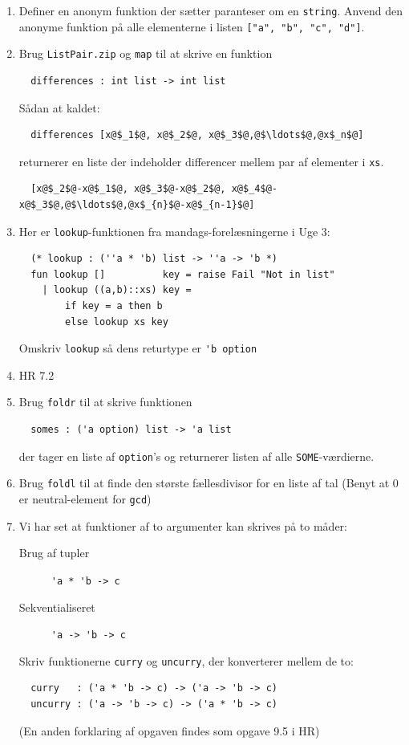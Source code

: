 \documentclass[a4paper,12pt]{article}
\begin{document}
\begin{enumerate}[{4}M1]
\item Definer en anonym funktion der sætter paranteser om en
  \lstinline{string}. Anvend den anonyme funktion på alle elementerne
  i listen \lstinline{["a", "b", "c", "d"]}.
\item Brug \lstinline{ListPair.zip} og \lstinline{map} til at skrive en funktion
\begin{lstlisting}
  differences : int list -> int list
\end{lstlisting}
  Sådan at kaldet:
\begin{lstlisting}
  differences [x@$_1$@, x@$_2$@, x@$_3$@,@$\ldots$@,@x$_n$@]
\end{lstlisting}
  returnerer en liste der indeholder differencer mellem par af
  elementer i \lstinline{xs}.
\begin{lstlisting}
  [x@$_2$@-x@$_1$@, x@$_3$@-x@$_2$@, x@$_4$@-x@$_3$@,@$\ldots$@,@x$_{n}$@-x@$_{n-1}$@]
\end{lstlisting}

\item Her er \lstinline{lookup}-funktionen fra mandags-forelæsningerne
  i Uge 3:
\begin{lstlisting}
  (* lookup : (''a * 'b) list -> ''a -> 'b *)
  fun lookup []          key = raise Fail "Not in list"
    | lookup ((a,b)::xs) key = 
        if key = a then b
        else lookup xs key
\end{lstlisting}
Omskriv \lstinline{lookup} så dens returtype er \lstinline{'b option}

\item HR 7.2

\item Brug \lstinline{foldr} til at skrive funktionen
\begin{lstlisting}
  somes : ('a option) list -> 'a list
\end{lstlisting}
  der tager en liste af \lstinline{option}'s og returnerer listen af
  alle \lstinline{SOME}-værdierne.

\item Brug \lstinline{foldl} til at finde den største fællesdivisor
  for en liste af tal (Benyt at $0$ er neutral-element for \lstinline{gcd})

\item Vi har set at funktioner af to argumenter kan skrives på to måder:
  \begin{description}
  \item[Brug af tupler] \lstinline{'a * 'b -> c}
  \item[Sekventialiseret] \lstinline{'a -> 'b -> c}
  \end{description}
  
  Skriv funktionerne \lstinline{curry} og \lstinline{uncurry}, der
  konverterer mellem de to:

\begin{lstlisting}
  curry   : ('a * 'b -> c) -> ('a -> 'b -> c)
  uncurry : ('a -> 'b -> c) -> ('a * 'b -> c)
\end{lstlisting}

 (En anden forklaring af opgaven findes som opgave 9.5 i HR)
\end{enumerate}
\end{document}
